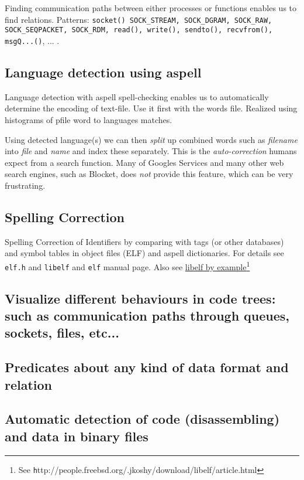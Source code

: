\documentclass[a4paper,10pt,twocolumn]{article}
\newcommand{\hrefn}[2]{\href{#1}{#2}\footnote{See {\texttt #1}}} %
\begin{document}
Finding
communication paths between either processes or functions enables us to find
relations.
Patterns: \texttt{socket() SOCK_STREAM, SOCK_DGRAM, SOCK_RAW, SOCK_SEQPACKET,
  SOCK_RDM, read(), write(), sendto(), recvfrom(), msgQ...()}, ... .

\subsection{Language detection using aspell}

Language detection with aspell
spell-checking enables us to automatically determine the encoding of
text-file. Use it first with the words file. Realized using histograms of pfile
word to languages matches.

Using detected language(s) we can then \emph{split} up combined
words such as \emph{filename} into \emph{file} and \emph{name}
and index these separately. This is the \emph{auto-correction}
humans expect from a search function. Many of Googles Services and
many other web search engines, such as Blocket, does \emph{not}
provide this feature, which can be very frustrating.

\subsection{Spelling Correction}

Spelling Correction of Identifiers by comparing with tags (or other databases)
and symbol tables in object files (ELF) and aspell dictionaries.  For details
see \texttt{elf.h} and \texttt{libelf} and \texttt{elf} manual page.  Also see
\hrefn{http://people.freebsd.org/.jkoshy/download/libelf/article.html}{libelf by
  example}

\subsection{Visualize different behaviours in code trees: such as communication paths through queues, sockets, files, etc...}


\subsection{Predicates about any kind of data format and relation}


\subsection{Automatic detection of code (disassembling) and data in binary files}
\end{document}
